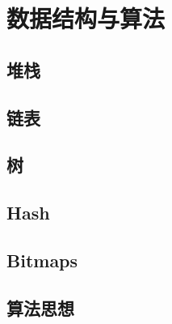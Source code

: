 \chapter{数据结构与算法}

\section{堆栈}

\section{链表}

\section{树}

\section{Hash}

\section{Bitmaps}

\section{算法思想}
